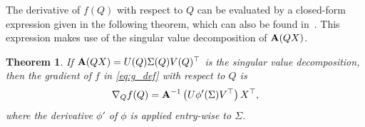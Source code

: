 \documentclass[pdflatex,sn-mathphys-num]{sn-jnl}
\newcounter{thm}[section]
\newtheorem{theorem}[thm]{Theorem}
\newcommand{\bfA}[1]{{\textbf A}(#1)}
\begin{document}
The derivative of $f(Q)$ with respect to $Q$ can be evaluated by a closed-form expression given in the following 
theorem, which can also be found in~\cite{lese:2005b}.
This expression makes use of the singular value decomposition of $\bfA{QX}$. 


\begin{theorem} \label{thm:euclidean_grad} 
    If $\bfA{QX} = U(Q) \Sigma(Q) V(Q)^{\top}$ is the singular value decomposition, then the gradient of $f$ in \eqref{eq:g_def} with respect to $Q$ is 
    \begin{equation} \label{eq:euclidean_grad}
    \nabla_Q f(Q) = {\bf A}^{-1}\left(U\phi'(\Sigma) V^{\top} \right) X^{\top}, 
    \end{equation}
    where the derivative $\phi'$ of $\phi$ is applied entry-wise to $\Sigma$. 
\end{theorem}
%
\end{document}
